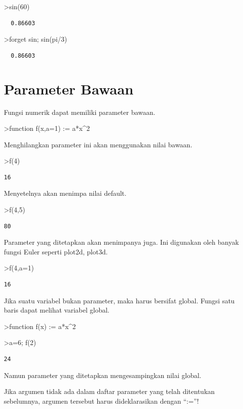 \documentclass[
]{book}
\begin{document}
\textgreater sin(60)

\begin{verbatim}
  0.86603 
\end{verbatim}

\textgreater forget sin; sin(pi/3)

\begin{verbatim}
  0.86603 
\end{verbatim}

\section{Parameter Bawaan}\label{parameter-bawaan}

Fungsi numerik dapat memiliki parameter bawaan.

\textgreater function f(x,a=1) := a*x\^{}2

Menghilangkan parameter ini akan menggunakan nilai bawaan.

\textgreater f(4)

\begin{verbatim}
16
\end{verbatim}

Menyetelnya akan menimpa nilai default.

\textgreater f(4,5)

\begin{verbatim}
80
\end{verbatim}

Parameter yang ditetapkan akan menimpanya juga. Ini digunakan oleh banyak fungsi Euler seperti plot2d, plot3d.

\textgreater f(4,a=1)

\begin{verbatim}
16
\end{verbatim}

Jika suatu variabel bukan parameter, maka harus bersifat global. Fungsi satu baris dapat melihat variabel global.

\textgreater function f(x) := a*x\^{}2

\textgreater a=6; f(2)

\begin{verbatim}
24
\end{verbatim}

Namun parameter yang ditetapkan mengesampingkan nilai global.

Jika argumen tidak ada dalam daftar parameter yang telah ditentukan sebelumnya, argumen tersebut harus dideklarasikan dengan ``:=''!
\end{document}
